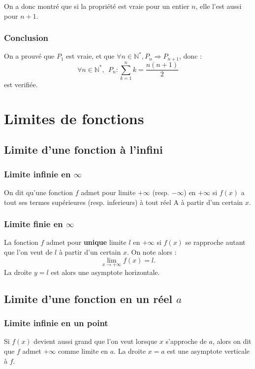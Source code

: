 \documentclass{report}
\begin{document}
    On a donc montré que si la propriété est vraie pour un entier \( n \), elle l'est aussi pour \( n + 1 \).

    \subsubsection{Conclusion}

    On a prouvé que $P_1$ est vraie, et que $\forall n \in \mathbb{N}^*, P_n \Rightarrow P_{n+1}$, donc :
    \[
    \forall n \in \mathbb{N}^*, ~~P_n : \sum_{k=1}^{n} k = \frac{n(n+1)}{2}
    \]
    est verifiée.






    \newpage

    \section{Limites de fonctions}
    \label{sec:limFonction}

    \subsection{Limite d'une fonction à l'infini}
    \subsubsection{Limite infinie en \(\infty\)}
    On dit qu'une fonction \(f\) admet pour limite \(+\infty\) (resp. $-\infty$) en \(+\infty\) si \(f(x)\) a tout ses termes supérieures (resp. inferieurs) à tout réel A à partir d'un certain $x$.

    \subsubsection{Limite finie en \(\infty\)}
    La fonction \(f\) admet pour \textbf{unique} limite \(l\) en \(+\infty\) si \(f(x)\) se rapproche autant que l'on veut de $l$ à partir d'un certain $x$. On note alors : 
    \[
    \lim_{x \to +\infty} f(x) = l.
    \]
    La droite \(y = l\) est alors une asymptote horizontale.

    \subsection{Limite d'une fonction en un réel \(a\)}
      \subsubsection{Limite infinie en un point}
        Si \(f(x)\) devient aussi grand que l'on veut lorsque \(x\) s'approche de \(a\), alors on dit que \(f\) admet \(+\infty\) comme limite en \(a\). La droite \(x = a\) est une asymptote verticale à $f$.
      
\end{document}
